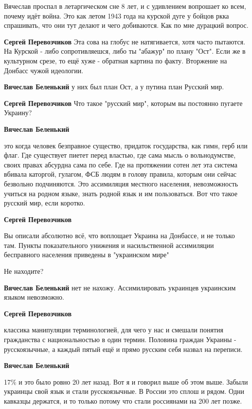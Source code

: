 \begin{itemize}
Вячеслав проспал в летаргическом сне 8 лет, и с удивлением вопрошает ко всем,
почему идёт война. Это как летом 1943 года на курской дуге у бойцов ркка
спрашивать, что они тут делают и чего добиваются. Как по мне дурацкий вопрос.

\begin{itemize} %
\textbf{Сергей Перевозчиков}
Эта сова на глобус не натягивается, хотя часто пытаются.
На Курской - либо сопротивляешся, либо ты "абажур" по плану "Ост".
Если же в культурном срезе, то ещё хуже - обратная картина по факту.
Вторжение на Донбасс чужой идеологии.

\textbf{Вячеслав Беленький} у них был план Ост, а у путина план Русский мир.

\textbf{Сергей Перевозчиков}
Что такое "русский мир", которым вы постоянно пугаете Украину?

\textbf{Вячеслав Беленький} 

это когда человек безправное существо, придаток государства, как гимн, герб или
флаг. Где существует пиетет перед властью, где сама мысль о вольнодумстве,
своих правах абсурдна сама по себе. Где на протяжении сотен лет эта система
вбивала каторгой, гулагом, ФСБ людям в голову правила, которым они сейчас
безвольно подчиняются. Это ассимиляция местного населения, невозможность
учиться на родном языке, знать родной язык и им пользоваться. Вот что такое
русский мир, если коротко.

\textbf{Сергей Перевозчиков}

Вы описали абсолютно всё, что воплощает Украина на Донбассе, и не только там.
Пункты показательного унижения и насильственной ассимиляции бесправного
населения приведены в "украинском мире"

Не находите?

\textbf{Вячеслав Беленький} нет не нахожу. Ассимилировать украинцев украинским языком невозможно.

\textbf{Сергей Перевозчиков}

классика манипуляции терминологией, для чего у нас и смешали понятия гражданства с национальностью в один термин.
Половина граждан Украины - русскоязычные, а каждый пятый ещё и прямо русским себя назвал на переписи.

\textbf{Вячеслав Беленький} 

17\% и это было ровно 20 лет назад. Вот я и говорил выше об этом выше. Забыли
украинцы свой язык и стали русскоязычные. В России это сплош и рядом. Одни
кавказцы держатся, и то только потому что стали россиянами на 200 лет позже.


\end{itemize}
\end{itemize}
